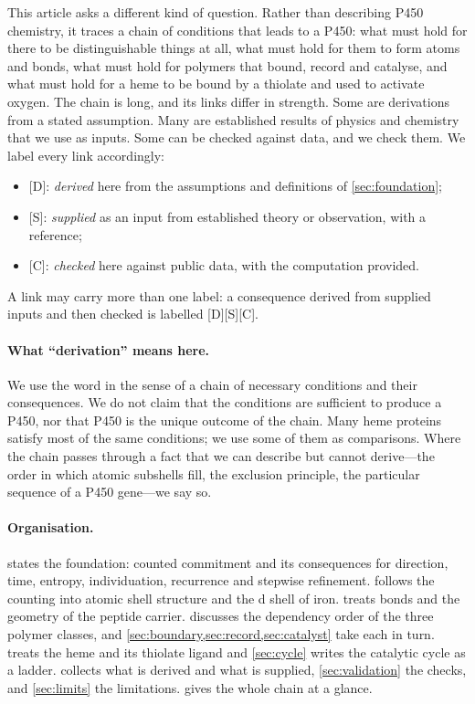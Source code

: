 \documentclass[10pt,twocolumn,a4paper]{article}
\newcommand{\D}{\textsf{[D]}}
\newcommand{\Sup}{\textsf{[S]}}
\newcommand{\C}{\textsf{[C]}}
\begin{document}
This article asks a different kind of question. Rather than describing P450
chemistry, it traces a chain of conditions that leads to a P450: what must
hold for there to be distinguishable things at all, what must hold for them
to form atoms and bonds, what must hold for polymers that bound, record and
catalyse, and what must hold for a heme to be bound by a thiolate and used to
activate oxygen. The chain is long, and its links differ in strength. Some are
derivations from a stated assumption. Many are established results of physics
and chemistry that we use as inputs. Some can be checked against data, and we
check them. We label every link accordingly:
\begin{itemize}[nosep]
\item \D{}: \emph{derived} here from the assumptions and definitions of
      \cref{sec:foundation};
\item \Sup{}: \emph{supplied} as an input from established theory or
      observation, with a reference;
\item \C{}: \emph{checked} here against public data, with the computation
      provided.
\end{itemize}
A link may carry more than one label: a consequence derived from supplied
inputs and then checked is labelled \D\Sup\C.

\paragraph{What ``derivation'' means here.}
We use the word in the sense of a chain of necessary conditions and their
consequences. We do not claim that the conditions are sufficient to produce a
P450, nor that P450 is the unique outcome of the chain. Many heme proteins
satisfy most of the same conditions; we use some of them as comparisons. Where
the chain passes through a fact that we can describe but cannot derive---the
order in which atomic subshells fill, the exclusion principle, the
particular sequence of a P450 gene---we say so.

\paragraph{Organisation.}
 states the foundation: counted commitment and its
consequences for direction, time, entropy, individuation, recurrence and
stepwise refinement.  follows the counting into atomic shell
structure and the d shell of iron.  treats bonds and the
geometry of the peptide carrier.  discusses the dependency
order of the three polymer classes, and \cref{sec:boundary,sec:record,sec:catalyst}
take each in turn.  treats the heme and its thiolate ligand and
\cref{sec:cycle} writes the catalytic cycle as a ladder. 
collects what is derived and what is supplied, \cref{sec:validation} the
checks, and \cref{sec:limits} the limitations.  gives the
whole chain at a glance.
\end{document}
